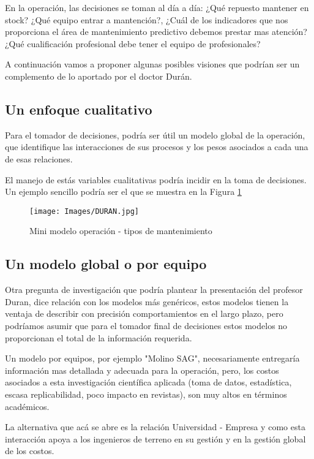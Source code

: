 \documentclass{article}
\begin{document}
En la operación, las decisiones se toman al día a día: ¿Qué repuesto mantener en stock? ¿Qué equipo entrar a mantención?, ¿Cuál de los indicadores que nos proporciona el área de mantenimiento predictivo debemos prestar mas atención? ¿Qué cualificación profesional debe tener el equipo de profesionales?

A continuación vamos a proponer algunas posibles visiones que podrían ser un complemento de lo aportado por el doctor Durán.

\subsection{Un enfoque cualitativo}
Para el tomador de decisiones, podría ser útil un modelo global de la operación, que identifique las interacciones de sus procesos y los pesos asociados a cada una de esas relaciones.

El manejo de estás variables cualitativas podría incidir en la toma de decisiones. Un ejemplo sencillo podría ser el que se muestra en la Figura \ref{duran} 

\begin{figure}[H]
\texttt{[image: Images/DURAN.jpg]}
\centering
\caption{Mini modelo operación - tipos de mantenimiento}
\label{duran}
\end{figure}


\subsection{Un modelo global o por equipo}

Otra pregunta de investigación que podría plantear la presentación del profesor Duran, dice relación con los modelos más genéricos, estos modelos tienen la ventaja de describir con precisión comportamientos en el largo plazo, pero podríamos asumir que para el tomador final de decisiones estos modelos no proporcionan el total de la información requerida.

Un modelo por equipos, por ejemplo "Molino SAG", necesariamente entregaría información mas detallada y adecuada para la operación, pero, los costos asociados a esta investigación científica aplicada (toma de datos, estadística, escasa replicabilidad, poco impacto en revistas), son muy altos en términos académicos.

La alternativa que acá se abre es la relación Universidad - Empresa y como esta interacción apoya a los ingenieros de terreno en su gestión y en la gestión global de los costos.
\end{document}
